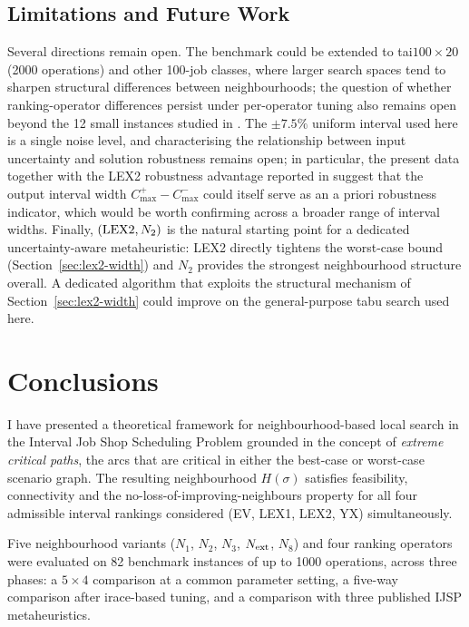 \documentclass[preprint,12pt]{elsarticle}
\begin{document}
\subsection{Limitations and Future Work}
\label{sec:limitations}

Several directions remain open. The benchmark could be extended to tai$100{\times}20$ (2000 operations) and other 100-job classes, where larger search spaces tend to sharpen structural differences between neighbourhoods; the question of whether ranking-operator differences persist under per-operator tuning also remains open beyond the 12 small instances studied in \cite{DiazICAE2023,DiazIGPL2022}. The $\pm 7.5\%$ uniform interval used here is a single noise level, and characterising the relationship between input uncertainty and solution robustness remains open; in particular, the present data together with the LEX2 robustness advantage reported in \cite{DiazICAE2023,DiazIGPL2022} suggest that the output interval width $C^+_{\max} - C^-_{\max}$ could itself serve as an a priori robustness indicator, which would be worth confirming across a broader range of interval widths. Finally, $({\rm LEX2}, N_2)$ is the natural starting point for a dedicated uncertainty-aware metaheuristic: LEX2 directly tightens the worst-case bound (Section~\ref{sec:lex2-width}) and $N_2$ provides the strongest neighbourhood structure overall. A dedicated algorithm that exploits the structural mechanism of Section~\ref{sec:lex2-width} could improve on the general-purpose tabu search used here.


\section{Conclusions}
\label{sec:conclusions}

I have presented a theoretical framework for neighbourhood-based local search in the Interval Job Shop Scheduling Problem grounded in the concept of \emph{extreme critical paths}, the arcs that are critical in either the best-case or worst-case scenario graph. The resulting neighbourhood $H(\sigma)$ satisfies feasibility, connectivity and the no-loss-of-improving-neighbours property for all four admissible interval rankings considered (EV, LEX1, LEX2, YX) simultaneously.

Five neighbourhood variants ($N_1$, $N_2$, $N_3$, $N_{\rm ext}$, $N_8$) and four ranking operators were evaluated on 82 benchmark instances of up to 1000 operations, across three phases: a $5 \times 4$ comparison at a common parameter setting, a five-way comparison after irace-based tuning, and a comparison with three published IJSP metaheuristics.
\end{document}
